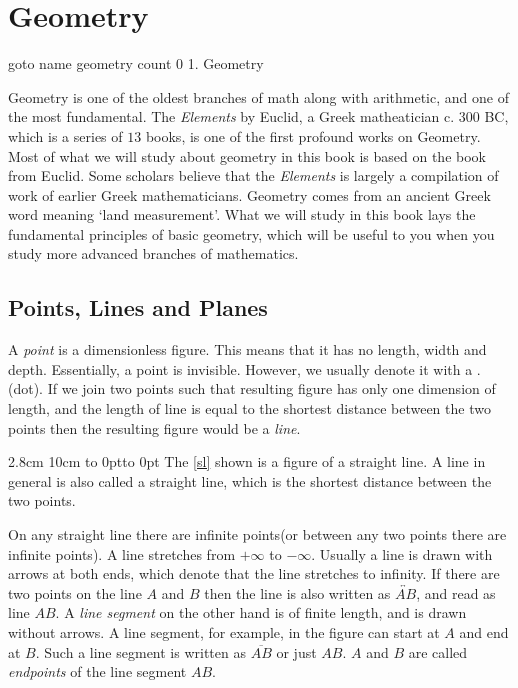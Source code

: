 \chapter{Geometry}

\pdfoutline goto name {geometry} count 0 {1. Geometry}%
%


\color{black}Geometry is one of the oldest branches of math along with arithmetic, and one of the most
fundamental. The {\it Elements} by Euclid, a Greek matheatician c. $300$ BC, which is a series of $13$
books, is one of the first profound works on Geometry. Most of what we will study about geometry in this
book is based on the book from Euclid. Some scholars believe that the {\it Elements} is
largely a compilation of work of earlier Greek mathematicians. Geometry comes from an ancient Greek word
meaning `land measurement'. What we will study in this book lays the fundamental principles of basic
geometry, which will be useful to you when you study more advanced branches of mathematics.

\section{Points, Lines and Planes}

%

\noindent A {\it point} is a dimensionless figure. This means that it has no length, width and depth. Essentially, a
point is invisible. However, we usually denote it with a .(dot). If we join two points such that resulting
figure has only one dimension of length, and the length of line is equal to the shortest distance between
the two points then the resulting figure would be a {\it line}.

2.8cm 10cm
\hbox to 0pt{\vbox to 0pt{%
\vss}\hss}
\indent The \ref{sl} shown is a figure of a straight line. A line in general is also called a straight line,
which is the shortest distance between the two points.

On any straight line there are infinite points(or between any two points there are infinite points). A line
stretches from $+\infty$ to $-\infty$. Usually a line
is drawn with arrows at both ends, which denote that the line stretches to infinity. If there are two points
on the line $A$ and $B$ then the line is also written as $\overleftrightarrow{AB}$, and read as line $AB$. A
{\it line segment} on the other hand is of finite length, and is drawn without arrows. A line segment, for
example, in the figure can start at $A$ and end at $B$. Such a line segment is written as $\overline{AB}$ or
just $AB$. $A$ and $B$ are called {\it endpoints} of the line segment $AB$.

